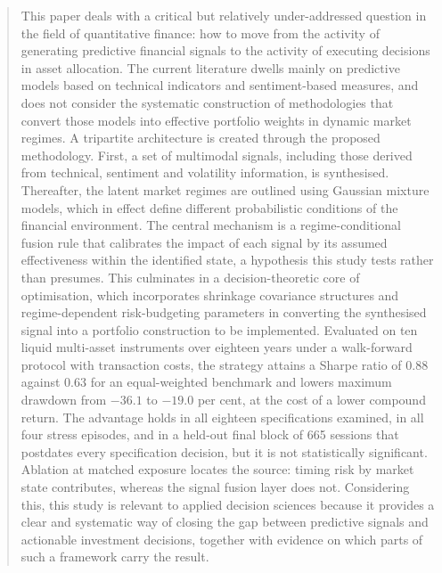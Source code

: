 \documentclass{singlecol-new}
\theoremstyle{TH}{
\newtheorem{lemma}{Lemma}
\newtheorem{theorem}[lemma]{Theorem}
\newtheorem{corrolary}[lemma]{Corrolary}
\newtheorem{conjecture}[lemma]{Conjecture}
\newtheorem{proposition}[lemma]{Proposition}
\newtheorem{claim}[lemma]{Claim}
\newtheorem{stheorem}[lemma]{Wrong Theorem}
\newtheorem{algorithm}{Algorithm}
}
\theoremstyle{THrm}{
\newtheorem{definition}{Definition}[section]
\newtheorem{question}{Question}[section]
\newtheorem{remark}{Remark}
\newtheorem{scheme}{Scheme}
}
\theoremstyle{THhit}{
\newtheorem{case}{Case}[section]
}
\begin{document}
\begin{abstract}
This paper deals with a critical but relatively under-addressed question in the field of
quantitative finance: how to move from the activity of generating predictive financial
signals to the activity of executing decisions in asset allocation. The current
literature dwells mainly on predictive models based on technical indicators and
sentiment-based measures, and does not consider the systematic construction of
methodologies that convert those models into effective portfolio weights in dynamic
market regimes. A tripartite architecture is created through the proposed methodology.
First, a set of multimodal signals, including those derived from technical, sentiment and
volatility information, is synthesised. Thereafter, the latent market regimes are
outlined using Gaussian mixture models, which in effect define different probabilistic
conditions of the financial environment. The central mechanism is a regime-conditional
fusion rule that calibrates the impact of each signal by its assumed effectiveness within
the identified state, a hypothesis this study tests rather than presumes. This culminates
in a decision-theoretic core of optimisation, which incorporates shrinkage covariance
structures and regime-dependent risk-budgeting parameters in converting the synthesised
signal into a portfolio construction to be implemented. Evaluated on ten liquid
multi-asset instruments over eighteen years under a walk-forward protocol with
transaction costs, the strategy attains a Sharpe ratio of 0.88 against 0.63 for an
equal-weighted benchmark and lowers maximum drawdown from $-36.1$ to $-19.0$ per cent, at
the cost of a lower compound return. The advantage holds in all eighteen specifications
examined, in all four stress episodes, and in a held-out final block of 665 sessions that
postdates every specification decision, but it is not statistically significant. Ablation
at matched exposure locates the source: timing risk by market state contributes, whereas
the signal fusion layer does not. Considering this, this study is relevant to applied
decision sciences because it provides a clear and systematic way of closing the gap
between predictive signals and actionable investment decisions, together with evidence on
which parts of such a framework carry the result.
\end{abstract}

\end{document}
